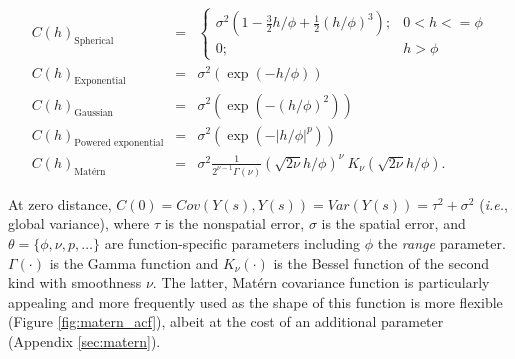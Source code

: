 \documentclass[letterpaper,portrait,11pt]{scrartcl}
\numberwithin{equation}{section}    %
\numberwithin{figure}{section}    %
\numberwithin{table}{section}       %
\begin{document}
\begin{eqnarray*}
  C(h)_{\textrm{Spherical}} &=& 
    \begin{cases}    
      \sigma^2( 1 - \frac{3}{2} h/\phi + \frac{1}{2}(h/\phi)^3 )  ; &   0 < h <= \phi \\
      0  ; &  h > \phi 
    \end{cases}  \\
  C(h)_{\text{Exponential}} &=& \sigma^2 ( \exp(-h/\phi) )   \\
  C(h)_{\text{Gaussian}} &=& \sigma^2 ( \exp(-(h/\phi)^2) ) \\
  C(h)_{\text{Powered exponential}} &=& \sigma^2 ( \exp(-| h/\phi | ^p) ) \\
  C(h)_{\text{Mat\'{e}rn}} &=& \sigma^2 \frac{1}{2^{\nu-1}\Gamma(\nu) } ( \sqrt{2\nu} h/\phi )^\nu \ K_{\nu} ( \sqrt{2\nu} h/\phi  )  .
\end{eqnarray*}


At zero distance, $C(0) = Cov( Y(s), Y(s)) = Var(Y(s)) = \tau^2 + \sigma^2$ (\textit{i.e.}, global variance), where $\tau$ is the nonspatial error, $\sigma$ is the spatial error, and $\theta=\{\phi, \nu, p, \dots \}$ are  function-specific parameters including $\phi$ the \textit{range} parameter. $\Gamma(\cdotp)$ is the Gamma function and $K_{\nu}(\cdotp)$ is the Bessel function of the second kind with smoothness $\nu$. The latter, Mat\'{e}rn covariance function is particularly appealing and more frequently used as the shape of this function is more flexible (Figure \ref{fig:matern_acf}), albeit at the cost of an additional parameter (Appendix \ref{sec:matern}). 
\end{document}
